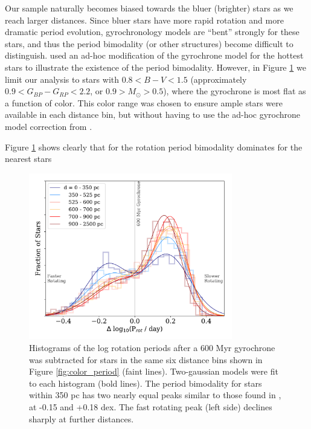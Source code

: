 \documentclass[preprint2]{aastex62}
\begin{document}
Our sample naturally becomes biased towards the bluer (brighter) stars as we reach larger distances. Since bluer stars have more rapid rotation and more dramatic period evolution, gyrochronology models are ``bent'' strongly for these stars, and thus the period bimodality (or other structures) become difficult to distinguish. \citet{davenport2017} used an ad-hoc modification of the gyrochrone model for the hottest stars to illustrate the existence of the period bimodality. However, in Figure \ref{fig:per_hist} we limit our analysis to stars with $0.8<B-V<1.5$ (approximately $0.9<G_{BP}-G_{RP}<2.2$, or $0.9>M_\odot> 0.5$), where the gyrochrone is most flat as a function of color. This color range was chosen to ensure ample stars were available in each distance bin, but without having to use the ad-hoc gyrochrone model correction from \citet{davenport2017}.

Figure \ref{fig:per_hist} shows clearly that for the rotation period bimodality dominates for the nearest stars

\begin{figure}[]
\centering
\includegraphics[width=3.5in]{../figures/delta_per_2gauss}
\caption{Histograms of the log rotation periods after a 600 Myr gyrochrone was subtracted for stars in the same six distance bins shown in Figure \ref{fig:color_period} (faint lines). Two-gaussian models were fit to each histogram (bold lines). 
The period bimodality for stars within 350 pc has two nearly equal peaks similar to those found in \citet{davenport2017}, at -0.15 and +0.18 dex. The fast rotating peak (left side) declines sharply at further distances.
}
\label{fig:per_hist}
\end{figure}
\end{document}
